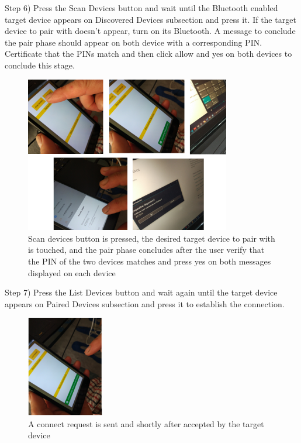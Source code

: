 Step 6) Press the Scan Devices button and wait until the Bluetooth enabled target device appears on Discovered Devices subsection and press it. If the target device to pair with doesn't appear, turn on its Bluetooth. A message to conclude the pair phase should appear on both device with a corresponding PIN. Certificate that the PINs match and then click allow and yes on both devices to conclude this stage.
%
\begin{figure}[!hbt]
\centering
\includegraphics[width=0.8\textwidth]{img/val6.png}
\caption{\label{fig:val6}Scan devices button is pressed, the desired target device to pair with is touched, and the pair phase concludes after the user verify that the PIN of the two devices matches and press yes on both messages displayed on each device}
\end{figure}
%

Step 7) Press the List Devices button and wait again until the target device appears on Paired Devices subsection and press it to establish the connection. 
%
\begin{figure}[!hbt]
\centering
\includegraphics[width=0.3\textwidth]{img/val7.png}
\caption{\label{fig:val7}A connect request is sent and shortly after accepted by the target device}
\end{figure}
%

